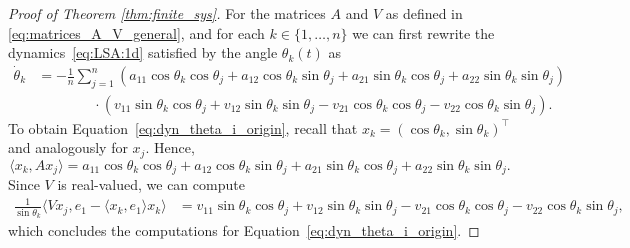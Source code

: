 \documentclass[10pt]{article}
\theoremstyle{definition}
\theoremstyle{definition}
\numberwithin{equation}{section}
\begin{document}
\begin{proof}[Proof of Theorem \ref{thm:finite_sys}]
For the matrices $A$ and $V$ as defined in \eqref{eq:matrices_A_V_general}, and
for each $k \in \{1,\dots,n\}$ we can first rewrite the dynamics~\eqref{eq:LSA:1d} satisfied by the angle $\theta_k(t)$ as
\begin{equation}\label{eq:dyn_theta_i_origin}
\begin{aligned}
    \Dot{\theta}_k &= -\frac{1}{n} \sum_{j=1}^n  \left(a_{11} \cos \theta_k \cos\theta_j + a_{12} \cos \theta_k \sin \theta_j + a_{21} \sin \theta_k\cos \theta_j + a_{22} \sin \theta_k \sin \theta_j\right) \\
    &\qquad \qquad \cdot \left( v_{11} \sin \theta_k \cos \theta_j + v_{12} \sin \theta_k \sin \theta_j - v_{21} \cos \theta_k \cos \theta_j - v_{22} \cos \theta_k \sin \theta_j \right).
\end{aligned}
\end{equation}
To obtain Equation~\eqref{eq:dyn_theta_i_origin}, recall that $x_k = (\cos\theta_k,\sin\theta_k)^\top$ and analogously for $x_j$.
Hence,
    \begin{equation*}
        \langle x_k, A x_j \rangle = a_{11} \cos \theta_k \cos\theta_j + a_{12} \cos \theta_k \sin \theta_j + a_{21} \sin \theta_k \cos \theta_j + a_{22} \sin \theta_k \sin \theta_j.
    \end{equation*}
    Since $V$ is real-valued, we can compute
    \begin{equation*}
    \begin{aligned}
        \frac{1}{\sin \theta_k} \langle V x_j, e_1-\langle x_k, e_1\rangle x_k \rangle
        &= v_{11} \sin \theta_k \cos \theta_j + v_{12} \sin \theta_k \sin \theta_j - v_{21} \cos \theta_k \cos \theta_j - v_{22} \cos \theta_k \sin \theta_j,
    \end{aligned}
    \end{equation*}
    which concludes the computations for Equation~\eqref{eq:dyn_theta_i_origin}.


\end{proof}
\end{document}
